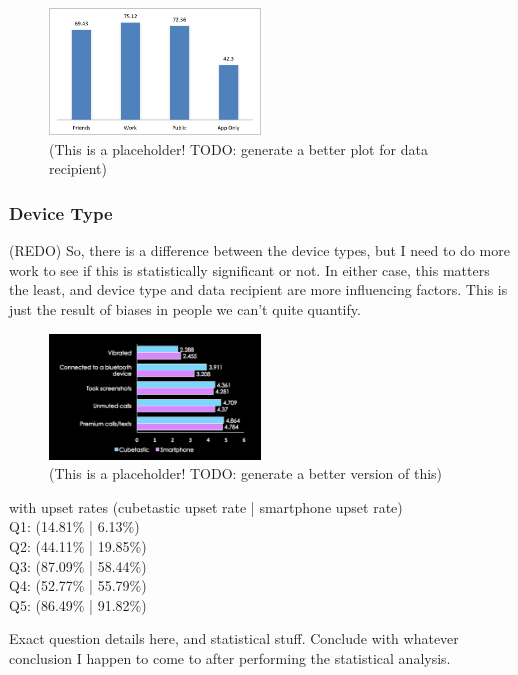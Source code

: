 \documentclass{acm_proc_article-sp}
\begin{document}
\begin{figure}
	\centering
	\includegraphics[width=0.5\textwidth]{recipient.png}
	\caption{(This is a placeholder! TODO: generate a better plot for data recipient)}
\end{figure}

\subsubsection{Device Type}
(REDO) So, there is a difference between the device types, but I need to do more work to see if this is statistically significant or not. In either case, this matters the least, and device type and data recipient are more influencing factors. This is just the result of biases in people we can't quite quantify.  

\begin{figure}
	\centering
	\includegraphics[width=0.5\textwidth]{device-type.png}
	\caption{(This is a placeholder! TODO: generate a better version of this)}
\end{figure}

with upset rates (cubetastic upset rate | smartphone upset rate)\\
Q1: (14.81\% | 6.13\%)\\
Q2: (44.11\% | 19.85\%)\\
Q3: (87.09\% | 58.44\%)\\
Q4: (52.77\% | 55.79\%)\\
Q5: (86.49\% | 91.82\%) 

Exact question details here, and statistical stuff. Conclude with whatever conclusion I happen to come to after performing the statistical analysis. 
\end{document}
